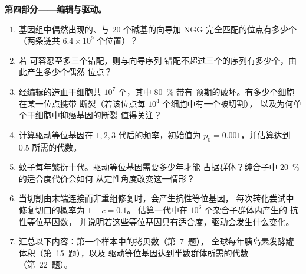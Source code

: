 \begin{problem}
\medskip
\noindent\textbf{第四部分——编辑与驱动。}
\begin{enumerate}[resume]
  \item 基因组中偶然出现的、与 20 个碱基的向导加 NGG
        完全匹配的位点有多少个（两条链共 $6.4\times 10^{9}$
        个位置）？
  \item 若  可容忍至多三个错配，则与向导序列
        错配不超过三个的序列有多少个，由此产生多少个偶然
        位点？
  \item 经编辑的造血干细胞共 $10^{7}$ 个，其中 \qty{80}{\%} 带有
        预期的破坏。有多少个细胞在某一位点携带
        断裂（若该位点每 $10^{4}$ 个细胞中有一个被切割），
        以及为何单个干细胞中抑癌基因的断裂
        值得关注？
  \item 计算驱动等位基因在 $1, 2, 3$ 代后的频率，初始值为
        $p_{0} = 0.001$，并估算达到 $0.5$ 所需的代数。
  \item 蚊子每年繁衍十代。驱动等位基因需要多少年才能
        占据群体？纯合子中 \qty{20}{\%} 的适合度代价会如何
        从定性角度改变这一情形？
  \item 当切割由末端连接而非重组修复时，会产生抗性等位基因，
        每次转化尝试中修复切口的概率为 $1 - c = 0.1$。
        估算一代中在 $10^{6}$ 个杂合子群体内产生的
        抗性等位基因数，
        并说明若这些等位基因具有适合度，驱动会发生什么变化。
  \item 汇总以下内容：第一个样本中的拷贝数（第~7~题），
        全球每年胰岛素发酵罐体积（第~15~题），以及
        驱动等位基因达到半数群体所需的代数
        （第~22~题）。
\end{enumerate}
\end{problem}
